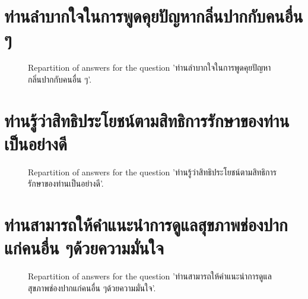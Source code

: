 \documentclass[12pt]{article}
\begin{document}
\clearpage{}
\section{ท่านลำบากใจในการพูดคุยปัญหากลิ่นปากกับคนอื่น ๆ}

\label{sec:84}


\begin{figure}[h!]
    \caption{\label{figure:q84-1}Repartition of answers for the question 'ท่านลำบากใจในการพูดคุยปัญหากลิ่นปากกับคนอื่น ๆ'.}
\end{figure}



\clearpage{}
\section{ท่านรู้ว่าสิทธิประโยชน์ตามสิทธิการรักษาของท่านเป็นอย่างดี}

\label{sec:85}


\begin{figure}[h!]
    \caption{\label{figure:q85-1}Repartition of answers for the question 'ท่านรู้ว่าสิทธิประโยชน์ตามสิทธิการรักษาของท่านเป็นอย่างดี'.}
\end{figure}



\clearpage{}
\section{ท่านสามารถให้คำแนะนำการดูแลสุขภาพช่องปากแก่คนอื่น ๆด้วยความมั่นใจ}

\label{sec:86}


\begin{figure}[h!]
    \caption{\label{figure:q86-1}Repartition of answers for the question 'ท่านสามารถให้คำแนะนำการดูแลสุขภาพช่องปากแก่คนอื่น ๆด้วยความมั่นใจ'.}
\end{figure}
\end{document}

